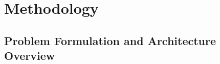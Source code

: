 \documentclass[journal]{IEEEtran}
\begin{document}
%



\fi

\section{Methodology}
\label{sec:method}

\subsection{Problem Formulation and Architecture Overview}
\label{subsec:overview}
\end{document}
